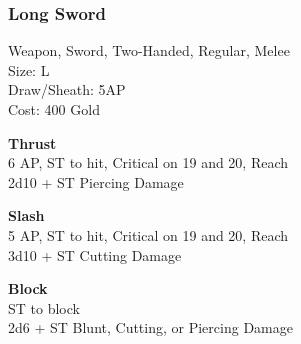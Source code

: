 \subsubsection{Long Sword}\label{weapon:longSword}
Weapon, Sword, Two-Handed, Regular, Melee\\
Size: L\\
Draw/Sheath: 5AP\\
Cost: 400 Gold

\textbf{Thrust}\\
6 AP, ST to hit, Critical on 19 and 20,  Reach\\
2d10 + \texttimes ST Piercing Damage

\textbf{Slash}\\
5 AP, ST to hit, Critical on 19 and 20,  Reach\\
3d10 + \texttimes ST Cutting Damage

\textbf{Block}\\
ST to block\\
2d6 + \texttimes ST Blunt, Cutting, or Piercing Damage